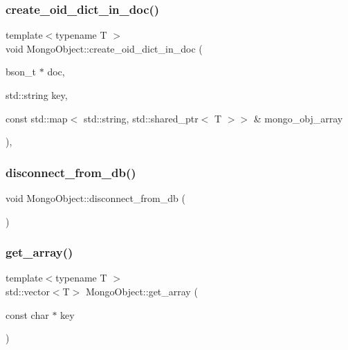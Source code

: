 \mbox{\label{class_mongo_object_ae8d85ac8089beca73773bd6189a2530c}} 
\subsubsection{\texorpdfstring{create\+\_\+oid\+\_\+dict\+\_\+in\+\_\+doc()}{create\_oid\_dict\_in\_doc()}}
{\footnotesize\ttfamily template$<$typename T $>$ \\
void Mongo\+Object\+::create\+\_\+oid\+\_\+dict\+\_\+in\+\_\+doc (\begin{DoxyParamCaption}\item[{bson\+\_\+t $\ast$}]{doc,  }\item[{std\+::string}]{key,  }\item[{const std\+::map$<$ std\+::string, std\+::shared\+\_\+ptr$<$ T $>$$>$ \&}]{mongo\+\_\+obj\+\_\+array }\end{DoxyParamCaption})\hspace{0.3cm}{\ttfamily [inline]}, {\ttfamily [protected]}}

\mbox{\label{class_mongo_object_ae541414f753a8fd792cf0be163117b99}} 
\subsubsection{\texorpdfstring{disconnect\+\_\+from\+\_\+db()}{disconnect\_from\_db()}}
{\footnotesize\ttfamily void Mongo\+Object\+::disconnect\+\_\+from\+\_\+db (\begin{DoxyParamCaption}{ }\end{DoxyParamCaption})}

\mbox{\label{class_mongo_object_ae1002573afb58658162fb7f53cd0bffc}} 
\subsubsection{\texorpdfstring{get\+\_\+array()}{get\_array()}}
{\footnotesize\ttfamily template$<$typename T $>$ \\
std\+::vector$<$T$>$ Mongo\+Object\+::get\+\_\+array (\begin{DoxyParamCaption}\item[{const char $\ast$}]{key }\end{DoxyParamCaption})\hspace{0.3cm}{\ttfamily [inline]}}

